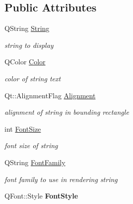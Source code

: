 \subsection*{Public Attributes}
\begin{DoxyCompactItemize}
\item 
\hypertarget{classText_aedb55d46b763e08f05098533acfbe22a}{Q\-String \hyperlink{classText_aedb55d46b763e08f05098533acfbe22a}{String}}\label{classText_aedb55d46b763e08f05098533acfbe22a}

\begin{DoxyCompactList}\small\item\em string to display \end{DoxyCompactList}\item 
\hypertarget{classText_a7080675fdb6da03a3d9fc141c3f9ee48}{Q\-Color \hyperlink{classText_a7080675fdb6da03a3d9fc141c3f9ee48}{Color}}\label{classText_a7080675fdb6da03a3d9fc141c3f9ee48}

\begin{DoxyCompactList}\small\item\em color of string text \end{DoxyCompactList}\item 
\hypertarget{classText_ac2f10e06ac4a483c431f7a0f5e589e0c}{Qt\-::\-Alignment\-Flag \hyperlink{classText_ac2f10e06ac4a483c431f7a0f5e589e0c}{Alignment}}\label{classText_ac2f10e06ac4a483c431f7a0f5e589e0c}

\begin{DoxyCompactList}\small\item\em alignment of string in bounding rectangle \end{DoxyCompactList}\item 
\hypertarget{classText_ada5a7bd7fd75b0c00b6343603690b40b}{int \hyperlink{classText_ada5a7bd7fd75b0c00b6343603690b40b}{Font\-Size}}\label{classText_ada5a7bd7fd75b0c00b6343603690b40b}

\begin{DoxyCompactList}\small\item\em font size of string \end{DoxyCompactList}\item 
\hypertarget{classText_a41605f83ceba0843f91b4cbbb62c16e2}{Q\-String \hyperlink{classText_a41605f83ceba0843f91b4cbbb62c16e2}{Font\-Family}}\label{classText_a41605f83ceba0843f91b4cbbb62c16e2}

\begin{DoxyCompactList}\small\item\em font family to use in rendering string \end{DoxyCompactList}\item 
\hypertarget{classText_aad61fa14cba6aa54be1a373fa052ddb2}{Q\-Font\-::\-Style {\bfseries Font\-Style}}\label{classText_aad61fa14cba6aa54be1a373fa052ddb2}


\end{DoxyCompactItemize}
